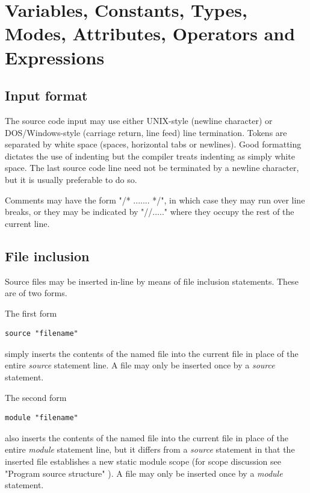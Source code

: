 \pagebreak

\chapter{Variables, Constants, Types, Modes, Attributes, Operators and Expressions}



    \section{Input format}
    
        The source code input may use either UNIX-style (newline character) or
        DOS/Windows-style (carriage return, line feed) line termination. Tokens
        are separated by white space (spaces, horizontal tabs or newlines). Good
        formatting dictates the use of indenting but the compiler treats
        indenting as simply white space. The last source code line need not be
        terminated by a newline character, but it is usually preferable to do
        so.

        Comments may have the form "/* ....... */", in which case they
        may run over line breaks, or they may be indicated by "//....."
        where they occupy the rest of the current line.


    \section{File inclusion}\label{sec:fileinclusion}

        Source files may be inserted in-line by means of file inclusion
        statements. These are of two forms.
        
        The first form
        \begin{lstlisting}[gobble=8, language=threepl]
           source "filename"
        \end{lstlisting}
        simply inserts the contents of the named file into the current file in
        place of the entire {\em source} statement line. A file may only be
        inserted once by a {\em source} statement.
        
        The second form
        \begin{lstlisting}[gobble=8, language=threepl]
           module "filename"
        \end{lstlisting}
        also inserts the contents of the named file into the current file in
        place of the entire {\em module} statement line, but it differs from a
        {\em source} statement in that the inserted file establishes a new
        static module scope (for scope discussion see "Program source structure"
        ). A file may only be inserted once by a
        {\em module} statement.

